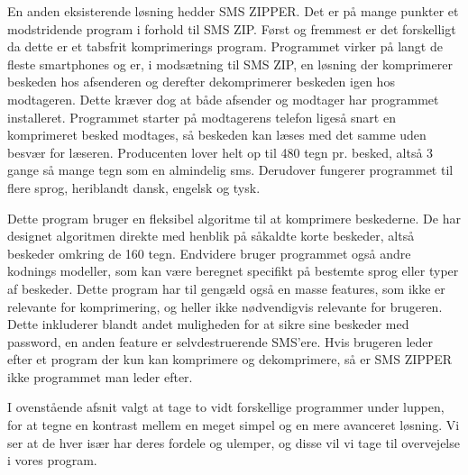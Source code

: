En anden eksisterende løsning hedder SMS ZIPPER. Det er på mange punkter et modstridende program i forhold til SMS ZIP. Først og fremmest er det forskelligt da dette er et tabsfrit komprimerings program. Programmet virker på langt de fleste smartphones og er, i modsætning til SMS ZIP, en løsning der komprimerer beskeden hos afsenderen og derefter dekomprimerer beskeden igen hos modtageren. Dette kræver dog at både afsender og modtager har programmet installeret. Programmet starter på modtagerens telefon ligeså snart en komprimeret besked modtages, så beskeden kan læses med det samme uden besvær for læseren. Producenten lover helt op til 480 tegn pr. besked, altså 3 gange så mange tegn som en almindelig sms. Derudover fungerer programmet til flere sprog, heriblandt dansk, engelsk og tysk.

Dette program bruger en fleksibel algoritme til at komprimere beskederne. De har designet algoritmen direkte med henblik på såkaldte korte beskeder, altså beskeder omkring de 160 tegn. Endvidere bruger programmet også andre kodnings modeller, som kan være beregnet specifikt på bestemte sprog eller typer af beskeder. Dette program har til gengæld også en masse features, som ikke er relevante for komprimering, og heller ikke nødvendigvis relevante for brugeren. Dette inkluderer blandt andet muligheden for at sikre sine beskeder med password, en anden feature er selvdestruerende SMS'ere. Hvis brugeren leder efter et program der kun kan komprimere og dekomprimere, så er SMS ZIPPER ikke programmet man leder efter.\cite{smszipper} 

I ovenstående afsnit valgt at tage to vidt forskellige programmer under luppen, for at tegne en kontrast mellem en meget simpel og en mere avanceret løsning. Vi ser at de hver især har deres fordele og ulemper, og disse vil vi tage til overvejelse i vores program.